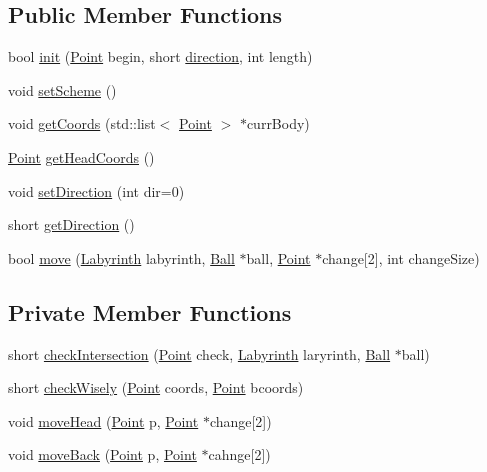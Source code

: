 \subsection*{Public Member Functions}
\begin{DoxyCompactItemize}
\item 
bool \mbox{\hyperlink{class_snake_a953fb7b8be521f651989bb53323e89ec}{init}} (\mbox{\hyperlink{common_8h_aa9cfdb80b4ca12013a2de8a3b9b97981}{Point}} begin, short \mbox{\hyperlink{class_snake_aee6d8cb1404c33a9b7e132a99e055590}{direction}}, int length)
\item 
void \mbox{\hyperlink{class_snake_a0c305e807c15736f809eb035d947c988}{set\+Scheme}} ()
\item 
void \mbox{\hyperlink{class_snake_a62fa59de03f60c23f6d1100c53594d71}{get\+Coords}} (std\+::list$<$ \mbox{\hyperlink{common_8h_aa9cfdb80b4ca12013a2de8a3b9b97981}{Point}} $>$ $\ast$curr\+Body)
\item 
\mbox{\hyperlink{common_8h_aa9cfdb80b4ca12013a2de8a3b9b97981}{Point}} \mbox{\hyperlink{class_snake_a0235581bc3d6399f4fd2287669f93cee}{get\+Head\+Coords}} ()
\item 
void \mbox{\hyperlink{class_snake_a151d9cab8233d38524c09642d079356a}{set\+Direction}} (int dir=0)
\item 
short \mbox{\hyperlink{class_snake_a2656a9a4490cbb70d305c323269cc5bd}{get\+Direction}} ()
\item 
bool \mbox{\hyperlink{class_snake_a6181d41b0920aff3fda1a90d59e8d382}{move}} (\mbox{\hyperlink{class_labyrinth}{Labyrinth}} labyrinth, \mbox{\hyperlink{class_ball}{Ball}} $\ast$ball, \mbox{\hyperlink{common_8h_aa9cfdb80b4ca12013a2de8a3b9b97981}{Point}} $\ast$change\mbox{[}2\mbox{]}, int change\+Size)
\end{DoxyCompactItemize}
\subsection*{Private Member Functions}
\begin{DoxyCompactItemize}
\item 
short \mbox{\hyperlink{class_snake_a7df802733cb62081ea360bb81ba9f304}{check\+Intersection}} (\mbox{\hyperlink{common_8h_aa9cfdb80b4ca12013a2de8a3b9b97981}{Point}} check, \mbox{\hyperlink{class_labyrinth}{Labyrinth}} laryrinth, \mbox{\hyperlink{class_ball}{Ball}} $\ast$ball)
\item 
short \mbox{\hyperlink{class_snake_a2f8cc670284cdebf4c9bbe60a7296deb}{check\+Wisely}} (\mbox{\hyperlink{common_8h_aa9cfdb80b4ca12013a2de8a3b9b97981}{Point}} coords, \mbox{\hyperlink{common_8h_aa9cfdb80b4ca12013a2de8a3b9b97981}{Point}} bcoords)
\item 
void \mbox{\hyperlink{class_snake_a59b2f5b18ab563d1583dfb15064784a0}{move\+Head}} (\mbox{\hyperlink{common_8h_aa9cfdb80b4ca12013a2de8a3b9b97981}{Point}} p, \mbox{\hyperlink{common_8h_aa9cfdb80b4ca12013a2de8a3b9b97981}{Point}} $\ast$change\mbox{[}2\mbox{]})
\item 
void \mbox{\hyperlink{class_snake_a577892c68b457316f7a9f3944c464569}{move\+Back}} (\mbox{\hyperlink{common_8h_aa9cfdb80b4ca12013a2de8a3b9b97981}{Point}} p, \mbox{\hyperlink{common_8h_aa9cfdb80b4ca12013a2de8a3b9b97981}{Point}} $\ast$cahnge\mbox{[}2\mbox{]})
\end{DoxyCompactItemize}
